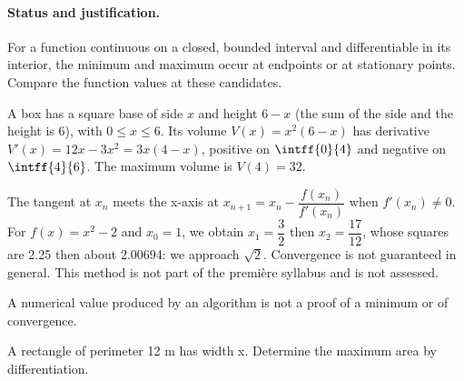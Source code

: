 \paragraph{Status and justification.} For a function continuous on a closed, bounded interval and differentiable in its interior, the minimum and maximum occur at endpoints or at stationary points. Compare the function values at these candidates.
\begin{example}A box has a square base of side $x$ and height $6-x$ (the sum of the side and the height is 6), with $0\le x\le6$. Its volume $V(x)=x^2(6-x)$ has derivative $V\prime(x)=12x-3x^2=3x(4-x)$, positive on $\intff{0}{4}$ and negative on $\intff{4}{6}$. The maximum volume is $V(4)=32$.\end{example}\label{C06-EX5}
\begin{beyond}The tangent at $x_n$ meets the x-axis at $x_{n+1}=x_n-\dfrac{f(x_n)}{f\prime(x_n)}$ when $f\prime(x_n)\ne0$. For $f(x)=x^2-2$ and $x_0=1$, we obtain $x_1=\dfrac{3}{2}$ then $x_2=\dfrac{17}{12}$, whose squares are \num{2,25} then about \num{2,00694}: we approach $\sqrt2$. Convergence is not guaranteed in general. This method is not part of the première syllabus and is not assessed.\end{beyond}
\begin{pitfall}A numerical value produced by an algorithm is not a proof of a minimum or of convergence.\end{pitfall}
\begin{application}A rectangle of perimeter 12 m has width x. Determine the maximum area by differentiation.\end{application}\label{C06-AP5}
\mxnewpage
